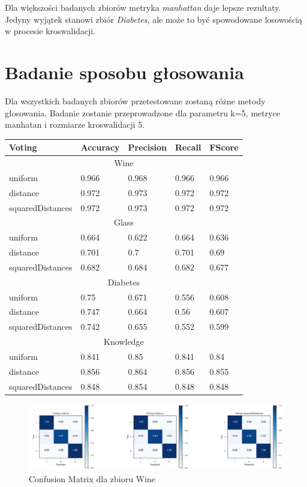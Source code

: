 \documentclass[12pt,a4paper]{article}
\begin{document}
Dla większości badanych zbiorów metryka \textit{manhattan} daje lepsze rezultaty. Jedyny wyjątek stanowi zbiór \textit{Diabetes}, ale może to być spowodowane losowością w procesie kroswalidacji.

\section{Badanie sposobu głosowania}
Dla wszystkich badanych zbiorów przetestowane zostaną różne metody głosowania. Badanie zostanie przeprowadzone dla parametru k=5, metryce manhatan i rozmiarze kroswalidacji 5.

\begin{tabular}{ |p{3cm}||p{2cm}|p{2cm}|p{2cm}|p{2cm}| }
\hline
Voting & Accuracy & Precision & Recall & FScore \\
\hline
\hline
\multicolumn{5}{|c|}{Wine}\\
\hline
uniform & 0.966 & 0.968 & 0.966 & 0.966\\
distance & 0.972 & 0.973 & 0.972 & 0.972\\
squaredDistances & 0.972 & 0.973 & 0.972 & 0.972\\
\hline
\multicolumn{5}{|c|}{Glass}\\
\hline
uniform & 0.664 & 0.622 & 0.664 & 0.636\\
distance & 0.701 & 0.7 & 0.701 & 0.69\\
squaredDistances & 0.682 & 0.684 & 0.682 & 0.677\\
\hline
\multicolumn{5}{|c|}{Diabetes}\\
\hline
uniform & 0.75 & 0.671 & 0.556 & 0.608\\
distance & 0.747 & 0.664 & 0.56 & 0.607\\
squaredDistances & 0.742 & 0.655 & 0.552 & 0.599\\
\hline
\multicolumn{5}{|c|}{Knowledge}\\
\hline
uniform & 0.841 & 0.85 & 0.841 & 0.84\\
distance & 0.856 & 0.864 & 0.856 & 0.855\\
squaredDistances & 0.848 & 0.854 & 0.848 & 0.848\\
\hline
\end{tabular}

\begin{figure}[H]
\centering
\includegraphics[width=1\textwidth]{VotingWine.PNG}
\caption{Confusion Matrix dla zbioru Wine}
\end{figure}
\end{document}

